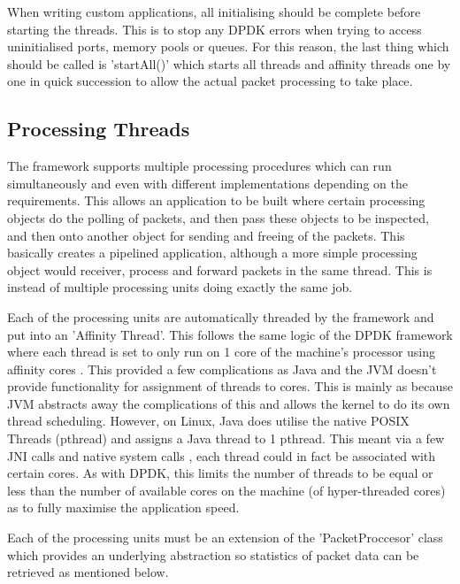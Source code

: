 \documentclass[final_report.tex]{subfiles}
\begin{document}
When writing custom applications, all initialising should be complete before starting the threads. This is to stop any DPDK errors when trying to access uninitialised ports, memory pools or queues. For this reason, the last thing which should be called is 'startAll()' which starts all threads and affinity threads one by one in quick succession to allow the actual packet processing to take place.


\subsection{Processing Threads}
The framework supports multiple processing procedures which can run simultaneously and even with different implementations depending on the requirements. This allows an application to be built where certain processing objects do the polling of packets, and then pass these objects to be inspected, and then onto another object for sending and freeing of the packets. This basically creates a pipelined application, although a more simple processing object would receiver, process and forward packets in the same thread. This is instead of multiple processing units doing exactly the same job.

Each of the processing units are automatically threaded by the framework and put into an 'Affinity Thread'. This follows the same logic of the DPDK framework where each thread is set to only run on 1 core of the machine's processor using affinity cores . This provided a few complications as Java and the JVM doesn't provide functionality for assignment of threads to cores. This is mainly as because JVM abstracts away the complications of this and allows the kernel to do its own thread scheduling. However, on Linux, Java does utilise the native POSIX Threads (pthread) and assigns a Java thread to 1 pthread. This meant via a few JNI calls and native system calls , each thread could in fact be associated with certain cores. As with DPDK, this limits the number of threads to be equal or less than the number of available cores on the machine (of hyper-threaded cores) as to fully maximise the application speed.

Each of the processing units must be an extension of the 'PacketProccesor' class which provides an underlying abstraction so statistics of packet data can be retrieved as mentioned below.
\end{document}
